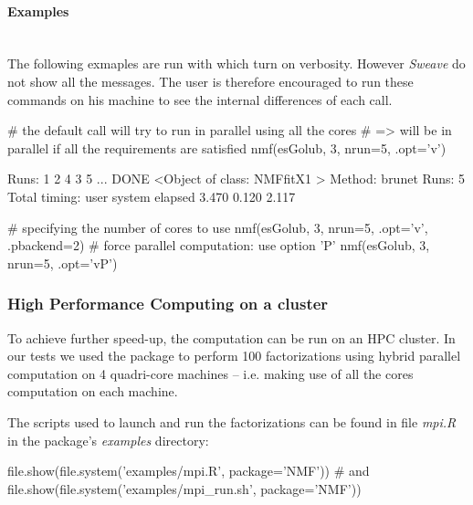 \documentclass[a4paper]{article}
\begin{document}
\paragraph{Examples}\ \\
The following exmaples are run with  which turn on verbosity.
However \emph{Sweave} do not show all the messages. 
The user is therefore encouraged to run these commands on his machine to see the internal differences of each call.

\begin{Schunk}
\begin{Sinput}
 # the default call will try to run in parallel using all the cores
 # => will be in parallel if all the requirements are satisfied
 nmf(esGolub, 3, nrun=5, .opt='v')
\end{Sinput}
\begin{Soutput}
Runs: 1 2 4 3 5 ... DONE
<Object of class: NMFfitX1 >
  Method: brunet 
  Runs:  5 
  Total timing:
   user  system elapsed 
  3.470   0.120   2.117 
\end{Soutput}
\end{Schunk}

\begin{Schunk}
\begin{Sinput}
 # specifying the number of cores to use 
 nmf(esGolub, 3, nrun=5, .opt='v', .pbackend=2)
 # force parallel computation: use option 'P'
 nmf(esGolub, 3, nrun=5, .opt='vP')
\end{Sinput}
\end{Schunk}


\subsubsection{High Performance Computing on a cluster}

To achieve further speed-up, the computation can be run on an HPC cluster.
In our tests we used the  package to perform 100 factorizations using 
hybrid parallel computation on 4 quadri-core machines -- i.e. making use of all 
the cores computation on each machine.

The scripts used to launch and run the factorizations can be found in file \emph{mpi.R}
in the package's \emph{examples} directory:

\begin{Schunk}
\begin{Sinput}
 file.show(file.system('examples/mpi.R', package='NMF'))
 # and
 file.show(file.system('examples/mpi_run.sh', package='NMF'))
\end{Sinput}
\end{Schunk}
\end{document}
